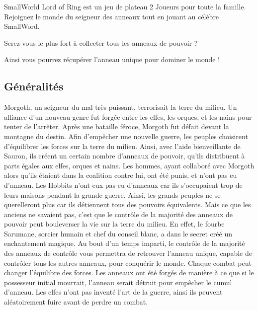 SmallWorld Lord of Ring est un jeu de plateau 2 Joueurs pour toute la famille. Rejoignez le monde du seigneur des anneaux tout en jouant au célèbre SmallWord.
\newline
\begin{center}
Serez-vous le plus fort à collecter tous les anneaux de pouvoir ?
\end{center}
\begin{center}
Ainsi vous pourrez récupérer l'anneau unique pour dominer le monde !
\end{center}

\subsection{Généralités}

Morgoth, un seigneur du mal très puissant, terrorisait la terre du milieu. Un alliance d'un nouveau genre fut forgée entre les elfes, les orques, et les nains pour tenter de l'arrêter. Après une bataille féroce, Morgoth fut défait devant la montagne du destin.
\newline
\newline
Afin d'empêcher une nouvelle guerre, les peuples choisirent d'équilibrer les forces sur la terre du milieu. Ainsi, avec l'aide bienveillante de Sauron, ils créent un certain nombre d'anneaux de pouvoir, qu'ils distribuent à parts égales aux elfes, orques et nains.
\newline
 Les hommes, ayant collaboré avec Morgoth alors qu'ils étaient dans la coalition contre lui, ont été punis, et n'ont pas eu d'anneau. Les Hobbits n'ont eux pas eu d'anneaux car ils s'occupaient trop de leurs maisons pendant la grande guerre.
\newline
\newline
Ainsi, les grands peuples ne se querelleront plus car ils détiennent tous des pouvoirs équivalents.
\newline
\newline
Mais ce que les anciens ne savaient pas, c'est que le contrôle de la majorité des anneaux de pouvoir peut bouleverser la vie sur la terre du milieu. En effet, le fourbe Sarumane, sorcier humain et chef du conseil blanc, a dans le secret créé un enchantement magique. Au bout d'un temps imparti, le contrôle de la majorité des anneaux de contrôle vous permettra de retrouver l'anneau unique, capable de contrôler tous les autres anneaux, pour conquérir le monde.
\newline
\newline
Chaque combat peut changer l'équilibre des forces. Les anneaux ont été forgés de manière à ce que si le possesseur initial mourrait, l'anneau serait détruit pour empêcher le cumul d'anneau. Les elfes n'ont pas inventé l'art de la guerre, ainsi ils peuvent aléatoirement fuire avant de perdre un combat. 
